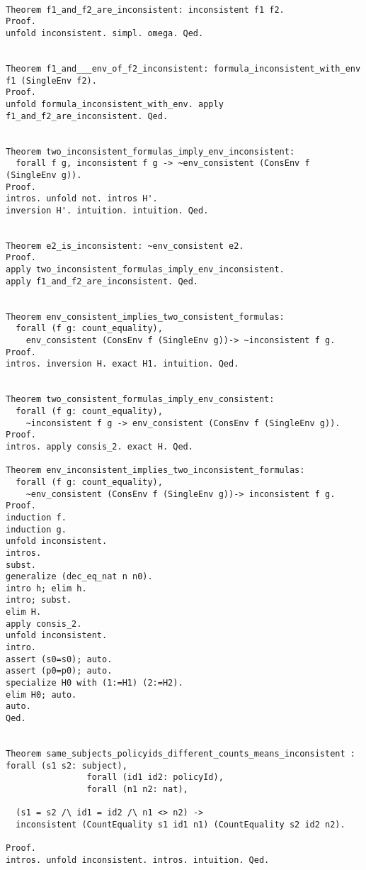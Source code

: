 \begin{lstlisting}[frame=single, caption={Inconsistent Environment}, label={lst:inconsistenttheorems}]

Theorem f1_and_f2_are_inconsistent: inconsistent f1 f2.
Proof. 
unfold inconsistent. simpl. omega. Qed.


Theorem f1_and___env_of_f2_inconsistent: formula_inconsistent_with_env f1 (SingleEnv f2).
Proof. 
unfold formula_inconsistent_with_env. apply f1_and_f2_are_inconsistent. Qed.


Theorem two_inconsistent_formulas_imply_env_inconsistent: 
  forall f g, inconsistent f g -> ~env_consistent (ConsEnv f (SingleEnv g)).
Proof. 
intros. unfold not. intros H'. 
inversion H'. intuition. intuition. Qed.


Theorem e2_is_inconsistent: ~env_consistent e2.
Proof.
apply two_inconsistent_formulas_imply_env_inconsistent. 
apply f1_and_f2_are_inconsistent. Qed.


Theorem env_consistent_implies_two_consistent_formulas: 
  forall (f g: count_equality), 
    env_consistent (ConsEnv f (SingleEnv g))-> ~inconsistent f g.
Proof. 
intros. inversion H. exact H1. intuition. Qed.


Theorem two_consistent_formulas_imply_env_consistent: 
  forall (f g: count_equality), 
    ~inconsistent f g -> env_consistent (ConsEnv f (SingleEnv g)).
Proof. 
intros. apply consis_2. exact H. Qed.

Theorem env_inconsistent_implies_two_inconsistent_formulas: 
  forall (f g: count_equality), 
    ~env_consistent (ConsEnv f (SingleEnv g))-> inconsistent f g.
Proof.
induction f.
induction g.
unfold inconsistent.
intros.
subst.
generalize (dec_eq_nat n n0).
intro h; elim h.
intro; subst.
elim H.
apply consis_2.
unfold inconsistent.
intro.
assert (s0=s0); auto.
assert (p0=p0); auto.
specialize H0 with (1:=H1) (2:=H2).
elim H0; auto.
auto.
Qed.


Theorem same_subjects_policyids_different_counts_means_inconsistent : forall (s1 s2: subject),
                forall (id1 id2: policyId),
                forall (n1 n2: nat),

  (s1 = s2 /\ id1 = id2 /\ n1 <> n2) -> 
  inconsistent (CountEquality s1 id1 n1) (CountEquality s2 id2 n2).

Proof. 
intros. unfold inconsistent. intros. intuition. Qed.



\end{lstlisting}
















